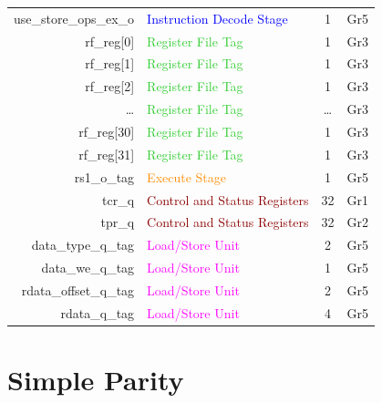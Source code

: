 \begin{table}
\begin{tabular}{rlcc}
        use\_store\_ops\_ex\_o          & \textcolor{blue}{Instruction Decode Stage}        & 1    & Gr5   \\\hdashline
        rf\_reg[0]                      & \textcolor{LimeGreen}{Register File Tag}          & 1    & Gr3   \\
        rf\_reg[1]                      & \textcolor{LimeGreen}{Register File Tag}          & 1    & Gr3   \\
        rf\_reg[2]                      & \textcolor{LimeGreen}{Register File Tag}          & 1    & Gr3   \\
        \ldots                      & \textcolor{LimeGreen}{Register File Tag}          & \ldots    & Gr3   \\
        rf\_reg[30]                     & \textcolor{LimeGreen}{Register File Tag}          & 1    & Gr3   \\
        rf\_reg[31]                     & \textcolor{LimeGreen}{Register File Tag}          & 1    & Gr3   \\\hdashline
        rs1\_o\_tag                     & \textcolor{DarkOrange}{Execute Stage}             & 1    & Gr5   \\\hdashline
        tcr\_q                          & \textcolor{DarkRed}{Control and Status Registers} & 32   & Gr1   \\
        tpr\_q                          & \textcolor{DarkRed}{Control and Status Registers} & 32   & Gr2   \\\hdashline
        data\_type\_q\_tag              & \textcolor{magenta}{Load/Store Unit}              & 2    & Gr5   \\
        data\_we\_q\_tag                & \textcolor{magenta}{Load/Store Unit}              & 1    & Gr5   \\
        rdata\_offset\_q\_tag           & \textcolor{magenta}{Load/Store Unit}              & 2    & Gr5   \\
        rdata\_q\_tag                   & \textcolor{magenta}{Load/Store Unit}              & 4    & Gr5   \\
        \bottomrule
    \end{tabular}
\end{table}
    

\section{Simple Parity}
\label{chapter:simpleparity}

